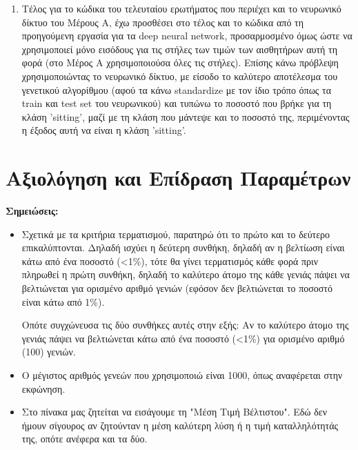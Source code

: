 \documentclass[12pt,a4paper]{article}
\begin{document}
\begin{enumerate}
    \item Τέλος για το κώδικα του τελευταίου ερωτήματος που περιέχει και το νευρωνικό δίκτυο του Μέρους Α, έχω προσθέσει στο τέλος και το κώδικα από τη προηγούμενη εργασία για τα deep neural network, προσαρμοσμένο όμως ώστε να χρησιμοποιεί μόνο εισόδους για τις στήλες των τιμών των αισθητήρων αυτή τη φορά (στο Μέρος Α χρησιμοποιούσα όλες τις στήλες). Επίσης κάνω πρόβλεψη χρησιμοποιώντας το νευρωνικό δίκτυο, με είσοδο το καλύτερο αποτέλεσμα του γενετικού αλγορίθμου (αφού τα κάνω standardize με τον ίδιο τρόπο όπως τα train και test set του νευρωνικού) και τυπώνω το ποσοστό που βρήκε για τη κλάση 'sitting', μαζί με τη κλάση που μάντεψε και το ποσοστό της, περιμένοντας η έξοδος αυτή να είναι η κλάση 'sitting'.
\end{enumerate}

\section{Αξιολόγηση και Επίδραση Παραμέτρων}

\textbf{Σημειώσεις:}
\begin{itemize}
    \item Σχετικά με τα κριτήρια τερματισμού, παρατηρώ ότι το πρώτο και το δεύτερο επικαλύπτονται. Δηλαδή ισχύει η δεύτερη συνθήκη, δηλαδή αν η βελτίωση είναι κάτω από ένα ποσοστό (<1\%), τότε θα γίνει τερματισμός κάθε φορά πριν πληρωθεί η πρώτη συνθήκη, δηλαδή το καλύτερο άτομο της κάθε γενιάς πάψει να βελτιώνεται για ορισμένο αριθμό γενιών (εφόσον δεν βελτιώνεται το ποσοστό είναι κάτω από 1\%).

    Οπότε συγχώνευσα τις δύο συνθήκες αυτές στην εξής: Αν το καλύτερο άτομο της γενιάς πάψει να βελτιώνεται κάτω από ένα ποσοστό (<1\%) για ορισμένο αριθμό (100) γενιών.

    \item Ο μέγιστος αριθμός γενεών που χρησιμοποιώ είναι 1000, όπως αναφέρεται στην εκφώνηση.

    \item Στο πίνακα μας ζητείται να εισάγουμε τη "Μέση Τιμή Βέλτιστου". Εδώ δεν ήμουν σίγουρος αν ζητούνταν η μέση καλύτερη λύση ή η τιμή καταλληλότητάς της, οπότε ανέφερα και τα δύο.

\end{itemize}
\end{document}
